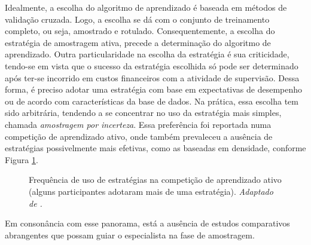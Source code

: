 Idealmente, a escolha do algoritmo de aprendizado é baseada em métodos de validação
cruzada. Logo, a escolha se dá com o conjunto de treinamento completo, ou seja,
amostrado e rotulado.
Consequentemente, a escolha do estratégia de amostragem ativa,
precede a determinação do algoritmo de aprendizado.
Outra particularidade na escolha da estratégia é
sua criticidade, tendo-se em vista que o sucesso da estratégia escolhida só pode ser
determinado após ter-se incorrido em custos financeiros com a atividade de supervisão.
Dessa forma, é preciso adotar uma estratégia com base em expectativas de desempenho
ou de acordo com características da base de dados.
Na prática, essa escolha tem sido arbitrária, tendendo a se concentrar
no uso da estratégia mais simples, chamada \textit{amostragem por incerteza}.
Essa preferência foi reportada numa competição de aprendizado ativo,
onde também prevaleceu a ausência de estratégias possivelmente mais efetivas,
como as baseadas em densidade, conforme
Figura \ref{compet}.
\begin{figure}
\caption{Frequência de uso de estratégias na competição de aprendizado ativo
(alguns participantes adotaram mais de uma estratégia).
\textit{Adaptado de \citep{journals/jmlr/GuyonCDL11}.}}
\label{compet}
\begin{center}
\end{center}
\end{figure}
Em consonância com esse panorama, está a ausência de estudos comparativos
abrangentes que possam guiar o especialista na fase de amostragem.

